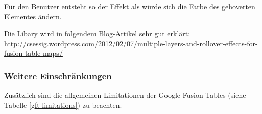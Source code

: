 Für den Benutzer entsteht so der Effekt als würde sich die Farbe des gehoverten Elementes ändern.

Die Libary wird in folgendem Blog-Artikel sehr gut erklärt: \url{http://csessig.wordpress.com/2012/02/07/multiple-layers-and-rollover-effects-for-fusion-table-maps/}

\subsubsection{Weitere Einschränkungen}
Zusätzlich sind die allgemeinen Limitationen der Google Fusion Tables (siehe Tabelle \ref{gft-limitations}) zu beachten.
